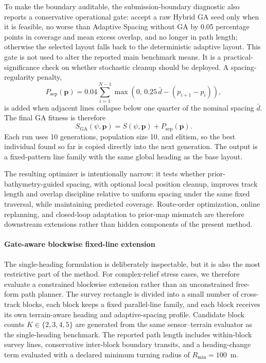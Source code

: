 \documentclass[jmse,article,submit,moreauthors]{Definitions/mdpi}
\begin{document}
To make the boundary auditable, the submission-boundary diagnostic also reports a conservative operational gate: accept a raw Hybrid GA seed only when it is feasible, no worse than Adaptive Spacing without GA by 0.05 percentage points in coverage and mean excess overlap, and no longer in path length; otherwise the selected layout falls back to the deterministic adaptive layout. This gate is not used to alter the reported main benchmark means. It is a practical-significance check on whether stochastic cleanup should be deployed. A spacing-regularity penalty,
\begin{equation}
P_{\mathrm{sep}}(\mathbf{p})
=
0.04\sum_{i=1}^{N-1}\max\!\left(0,\,0.25\,\bar{d}-\left(p_{i+1}-p_i\right)\right),
\end{equation}
is added when adjacent lines collapse below one quarter of the nominal spacing $\bar{d}$. The final GA fitness is therefore
\begin{equation}
S_{\mathrm{GA}}(\psi,\mathbf{p})=S(\psi,\mathbf{p})+P_{\mathrm{sep}}(\mathbf{p}).
\end{equation}
Each run uses 10 generations, population size 10, and elitism, so the best individual found so far is copied directly into the next generation. The output is a fixed-pattern line family with the same global heading as the base layout.

The resulting optimizer is intentionally narrow: it tests whether prior-bathymetry-guided spacing, with optional local position cleanup, improves track length and overlap discipline relative to uniform spacing under the same fixed traversal, while maintaining predicted coverage. Route-order optimization, online replanning, and closed-loop adaptation to prior-map mismatch are therefore downstream extensions rather than hidden components of the present method.

\paragraph{Gate-aware blockwise fixed-line extension}
The single-heading formulation is deliberately inspectable, but it is also the most restrictive part of the method. For complex-relief stress cases, we therefore evaluate a constrained blockwise extension rather than an unconstrained free-form path planner. The survey rectangle is divided into a small number of cross-track blocks, each block keeps a fixed parallel-line family, and each block receives its own terrain-aware heading and adaptive-spacing profile. Candidate block counts \(K\in\{2,3,4,5\}\) are generated from the same sensor--terrain evaluator as the single-heading benchmark. The reported path length includes within-block survey lines, conservative inter-block boundary transits, and a heading-change term evaluated with a declared minimum turning radius of \(R_{\min}=100\)~m.
\end{document}
